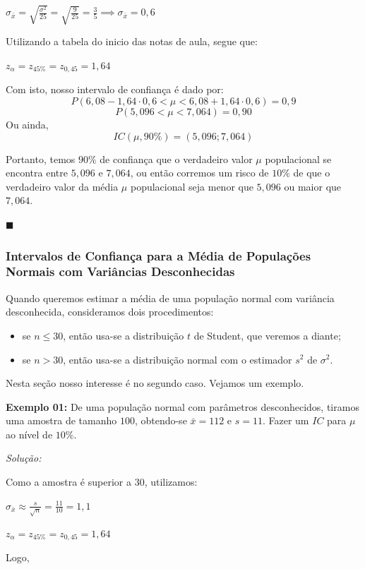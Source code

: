 \documentclass[oneside,a4paper,12pt]{article}
\begin{document}
$\sigma_{\bar{x}} = \displaystyle \sqrt{\frac{\sigma^2}{25}} = \sqrt{\frac{9}{25}} = \frac{3}{5} \implies \sigma_{\bar{x}} = 0,6$

Utilizando a tabela do inicio das notas de aula, segue que:

$z_\alpha = z_{45\%} = z_{0,45} = 1,64$

Com isto, nosso intervalo de confiança é dado por:
$$P(6,08 - 1,64 \cdot 0,6 < \mu < 6,08 + 1,64 \cdot 0,6) = 0,9$$
$$P(5,096 < \mu < 7,064) = 0,90$$
Ou ainda,
$$IC(\mu,90\%) = (5,096; 7,064)$$

Portanto, temos $90\%$ de confiança que o verdadeiro valor  $\mu$ populacional se encontra entre $5,096$ e $7,064$, ou então corremos um risco de $10\%$ de que o verdadeiro valor da média $\mu$ populacional seja menor que $5,096$ ou maior que $7,064$.

\begin{flushright}
	$\blacksquare$
\end{flushright}

\subsubsection{Intervalos de Confiança para a Média de Populações Normais com Variâncias Desconhecidas}

Quando queremos estimar a média de uma população normal com variância desconhecida, consideramos dois procedimentos:
\begin{itemize}
	\item se $n \leq 30$, então usa-se a distribuição $t$ de Student, que veremos a diante;
	\item se $n > 30$, então usa-se a distribuição normal com o estimador $s^2$ de $\sigma^2$.
\end{itemize}

Nesta seção nosso interesse é no segundo caso. Vejamos um exemplo.

\textbf{Exemplo 01:} De uma população normal com parâmetros desconhecidos, tiramos uma amostra de tamanho $100$, obtendo-se $\bar{x} = 112$ e $s = 11$. Fazer um $IC$ para $\mu$ ao nível de $10\%$.

\textit{Solução:} 

Como a amostra é superior a $30$, utilizamos:

$\sigma_{\bar{x}} \approx \displaystyle \frac{s}{\sqrt{n}} = \frac{11}{10} = 1,1$

$z_\alpha = z_{45\%} = z_{0,45} = 1,64$

Logo,
\end{document}
